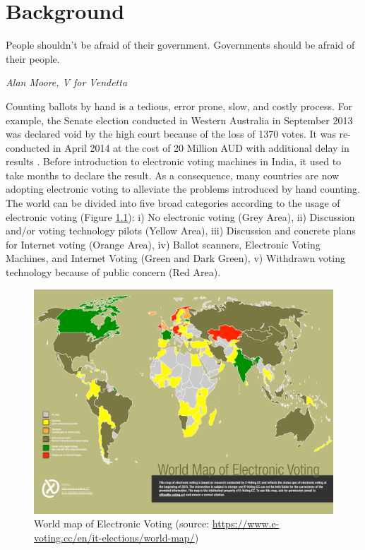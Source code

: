 \chapter{Background}
\label{cha:background}
\setlength{\parindent}{2em}
\setlength{\parskip}{1em}

\epigraph{People shouldn't be afraid of their government. Governments should be afraid of their people.} 
{\textit{Alan Moore, V for Vendetta }}
  Counting ballots by hand is a tedious, error prone, slow, and costly process. 
  For example, the Senate election conducted in Western Australia in September 2013 was 
  declared void by the high court because of the loss of 1370 votes. It was 
  re-conducted in April 2014 at the cost of 20 Million 
  AUD with additional  delay in results \citep{Aussentate}. Before introduction to 
  electronic voting machines in India, it used to take months to declare the result.
  As a consequence, many countries 
  are now adopting electronic voting to alleviate the problems introduced by hand counting. 
  The world can be divided into five broad categories according to 
  the usage of electronic voting \citep{Evoting} (Figure \ref{fig:world_electronic_voting_map}): i) No electronic 
  voting (Grey Area), ii)
  Discussion and/or voting technology pilots (Yellow Area), 
  iii) Discussion and concrete plans for Internet voting (Orange Area),
  iv) Ballot scanners, Electronic Voting Machines, and Internet Voting (Green and Dark Green),
  v) Withdrawn voting technology because of public concern (Red Area).
    \begin{figure}[!htb]
	\begin{center}
	\includegraphics[width=\textwidth,height=\textheight,keepaspectratio]{e-voting_worldmap_2015.pdf}
	\caption{World map of Electronic Voting (source: \url{https://www.e-voting.cc/en/it-elections/world-map/})}
	\label{fig:world_electronic_voting_map}
	\end{center}
  \end{figure}  
 
